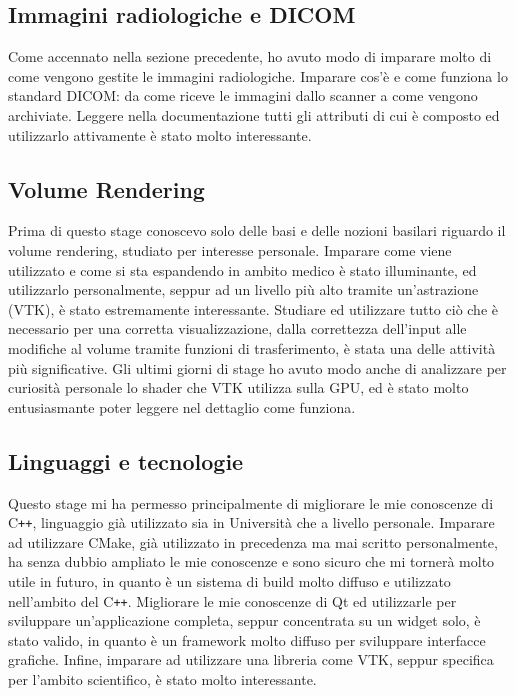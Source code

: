 \subsection{Immagini radiologiche e DICOM}
Come accennato nella sezione precedente, ho avuto modo di imparare molto di come vengono gestite le immagini radiologiche. Imparare cos'è e come funziona lo standard DICOM: da come riceve le immagini dallo scanner a come vengono archiviate. Leggere nella documentazione tutti gli attributi di cui è composto ed utilizzarlo attivamente è stato molto interessante.

\subsection{Volume Rendering}
Prima di questo stage conoscevo solo delle basi e delle nozioni basilari riguardo il volume rendering, studiato per interesse personale. Imparare come viene utilizzato e come si sta espandendo in ambito medico è stato illuminante, ed utilizzarlo personalmente, seppur ad un livello più alto tramite un'astrazione (VTK), è stato estremamente interessante. Studiare ed utilizzare tutto ciò che è necessario per una corretta visualizzazione, dalla correttezza dell'input alle modifiche al volume tramite funzioni di trasferimento, è stata una delle attività più significative. Gli ultimi giorni di stage ho avuto modo anche di analizzare per curiosità personale lo shader che VTK utilizza sulla GPU, ed è stato molto entusiasmante poter leggere nel dettaglio come funziona.

\subsection{Linguaggi e tecnologie}
Questo stage mi ha permesso principalmente di migliorare le mie conoscenze di C\texttt{++}, linguaggio già utilizzato sia in Università che a livello personale. Imparare ad utilizzare CMake, già utilizzato in precedenza ma mai scritto personalmente, ha senza dubbio ampliato le mie conoscenze e sono sicuro che mi tornerà molto utile in futuro, in quanto è un sistema di build molto diffuso e utilizzato nell'ambito del C\texttt{++}. Migliorare le mie conoscenze di Qt ed utilizzarle per sviluppare un'applicazione completa, seppur concentrata su un widget solo, è stato valido, in quanto è un framework molto diffuso per sviluppare interfacce grafiche. Infine, imparare ad utilizzare una libreria come VTK, seppur specifica per l'ambito scientifico, è stato molto interessante. 

